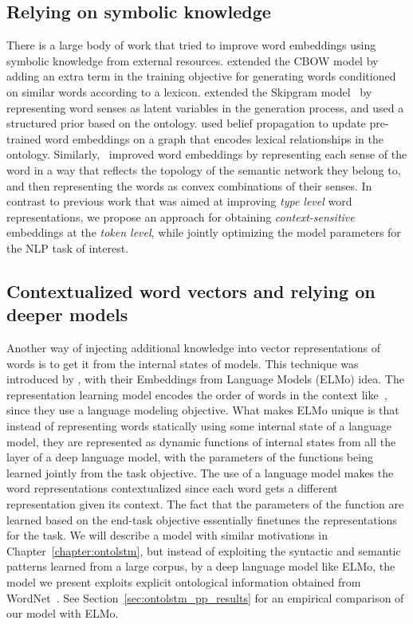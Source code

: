 \subsection{Relying on symbolic knowledge}
There is a large body of work that tried to improve word embeddings using symbolic knowledge from external resources.
\cite{yu:14} extended the CBOW model \citep{mikolov:13} by adding an extra term in the training objective for
generating words conditioned on similar words according to a lexicon.
\cite{jauhar:15} extended the Skipgram model~\citep{mikolov:13} by representing word senses as latent variables in
the generation process, and used a structured prior based on the ontology.
\cite{faruqui:15} used belief propagation to update pre-trained word embeddings on a graph that encodes lexical relationships in the ontology.
Similarly,~\cite{johansson2015embedding} improved word embeddings by representing each sense of the word in a way that reflects the topology of the semantic network they belong to, and then representing the words as convex combinations of their senses.
In contrast to previous work that was aimed at improving \textit{type level} word representations, we propose an approach for obtaining \textit{context-sensitive} embeddings at the \textit{token level}, while jointly optimizing the model parameters for the NLP task of interest.

\subsection{Contextualized word vectors and relying on deeper models}
Another way of injecting additional knowledge into vector representations of words is to get it from the internal
states of models. This technique was introduced by \cite{Peters:2018}, with their Embeddings from Language Models
(ELMo) idea. The representation learning model encodes the order of words in the context like~\cite{collobert2008unified},
since they use a language modeling objective. What makes ELMo unique is that
instead of representing words statically using some internal state of a language model, they are represented
as dynamic functions of internal states from all the layer of a deep language model, with the parameters of the
functions being learned jointly from the task objective.
The use of a language model makes the word representations contextualized
since each word gets a different representation given its
context. The fact that the parameters of the function are learned based on the end-task objective essentially
finetunes the representations for the task. We will describe a model with similar motivations in
Chapter~\ref{chapter:ontolstm}, but instead of exploiting the syntactic and semantic patterns learned from a large
corpus, by a deep language model like ELMo, the model we present exploits explicit ontological information obtained
from WordNet~\citep{miller1995wordnet}. See Section~\ref{sec:ontolstm_pp_results} for an empirical comparison of our
model with ELMo.

